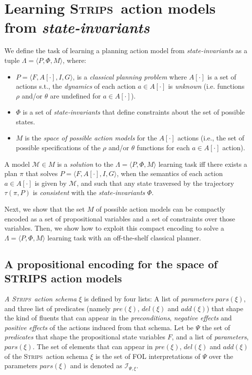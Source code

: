 \documentclass{article}
\newcommand{\tup}[1]{{\langle #1 \rangle}}
\newcommand{\strips}{\textsc{Strips}}
\begin{document}
\section{Learning \strips\ action models from {\em state-invariants}}
\label{sec:learning}
We define the task of learning a planning action model from {\em state-invariants} as a tuple $\Lambda=\tup{P,\Phi,M}$, where:
\begin{itemize}
\item $P=\tup{F,A[\cdot],I,G}$, is a {\em classical planning problem} where $A[\cdot]$ is a set of actions s.t., the {\em dynamics} of each action $a\in A[\cdot]$ is {\em unknown} (i.e. functions $\rho$ and/or $\theta$ are undefined for $a\in A[\cdot]$).
\item $\Phi$ is a set of {\em state-invariants} that define constraints about the set of possible states.
\item $M$ is the {\em space of possible action models} for the $A[\cdot]$ actions (i.e., the set of possible specifications of the $\rho$ and/or $\theta$ functions for each $a\in A[\cdot]$ action).
\end{itemize}

A model $\mathcal{M}\in M$ is a {\em solution} to the $\Lambda=\tup{P,\Phi,M}$ learning task iff there exists a plan $\pi$ that solves $P=\tup{F,A[\cdot],I,G}$, when the semantics of each action $a\in A[\cdot]$ is given by $\mathcal{M}$, and such that any state traversed by the trajectory $\tau(\pi,P)$ is {\em consistent} with the {\em state-invariants} $\Phi$.

Next, we show that the set $M$ of possible action models can be compactly encoded as a set of propositional variables and a set of constraints over those variables. Then, we show how to exploit this compact encoding to solve a $\Lambda=\tup{P,\Phi,M}$ learning task with an off-the-shelf classical planner.


\subsection{A propositional encoding for the space of STRIPS action models}
{\em A \strips\ action schema} $\xi$ is defined by four lists: A list of {\em parameters} $pars(\xi)$, and three list of predicates (namely $pre(\xi)$, $del(\xi)$ and $add(\xi)$) that shape the kind of fluents that can appear in the {\em preconditions}, {\em negative effects} and {\em positive effects} of the actions induced from that schema. Let be $\Psi$ the set of {\em predicates} that shape the propositional state variables $F$, and a list of {\em parameters}, $pars(\xi)$. The set of elements that can appear in $pre(\xi)$, $del(\xi)$ and $add(\xi)$ of the \strips\ action schema $\xi$ is the set of FOL interpretations of $\Psi$ over the parameters $pars(\xi)$ and is denoted as ${\mathcal I}_{\Psi,\xi}$.
\end{document}
